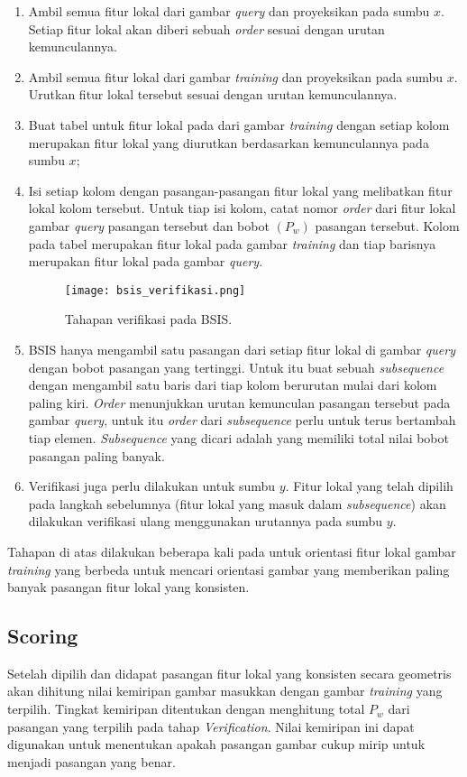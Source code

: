 \begin{enumerate}
	\item Ambil semua fitur lokal dari gambar \textit{query} dan proyeksikan pada sumbu $x$. Setiap fitur lokal akan diberi sebuah \textit{order} sesuai dengan urutan kemunculannya.
	\item Ambil semua fitur lokal dari gambar \textit{training} dan proyeksikan pada sumbu $x$. Urutkan fitur lokal tersebut sesuai dengan urutan kemunculannya.
	\item Buat tabel untuk fitur lokal pada dari gambar \textit{training} dengan setiap kolom merupakan fitur lokal yang diurutkan berdasarkan kemunculannya pada sumbu $x$;   
	\item Isi setiap kolom dengan pasangan-pasangan fitur lokal yang melibatkan fitur lokal kolom tersebut. Untuk tiap isi kolom, catat nomor \textit{order} dari fitur lokal gambar \textit{query} pasangan tersebut dan bobot $(P_w)$ pasangan tersebut. Kolom pada tabel merupakan fitur lokal pada gambar \textit{training} dan tiap barisnya merupakan fitur lokal pada gambar \textit{query}.
	\begin{figure}[H]
		\centering
		\texttt{[image: bsis\_verifikasi.png]}
		\label{fig:bsis_verifikasi}
		\caption{Tahapan verifikasi pada BSIS.}
	\end{figure}
	\item BSIS hanya mengambil satu pasangan dari setiap fitur lokal di gambar \textit{query} dengan bobot pasangan yang tertinggi. Untuk itu buat sebuah \textit{subsequence} dengan mengambil satu baris dari tiap kolom berurutan mulai dari kolom paling kiri. \textit{Order} menunjukkan urutan kemunculan pasangan tersebut pada gambar \textit{query}, untuk itu \textit{order} dari \textit{subsequence} perlu untuk terus bertambah tiap elemen. \textit{Subsequence} yang dicari adalah yang memiliki total nilai bobot pasangan paling banyak.
	\item Verifikasi juga perlu dilakukan untuk sumbu $y$. Fitur lokal yang telah dipilih pada langkah sebelumnya (fitur lokal yang masuk dalam \textit{subsequence}) akan dilakukan verifikasi ulang menggunakan urutannya pada sumbu $y$.
\end{enumerate}
Tahapan di atas dilakukan beberapa kali pada untuk orientasi fitur lokal gambar \textit{training} yang berbeda untuk mencari orientasi gambar yang memberikan paling banyak pasangan fitur lokal yang konsisten.

\subsection{Scoring}
\label{subsec:bsis_scoring}
Setelah dipilih dan didapat pasangan fitur lokal yang konsisten secara geometris akan dihitung nilai kemiripan gambar masukkan dengan gambar \textit{training} yang terpilih. Tingkat kemiripan ditentukan dengan menghitung total $P_w$ dari pasangan yang terpilih pada tahap \textit{Verification}. Nilai kemiripan ini dapat digunakan untuk menentukan apakah pasangan gambar cukup mirip untuk menjadi pasangan yang benar.

